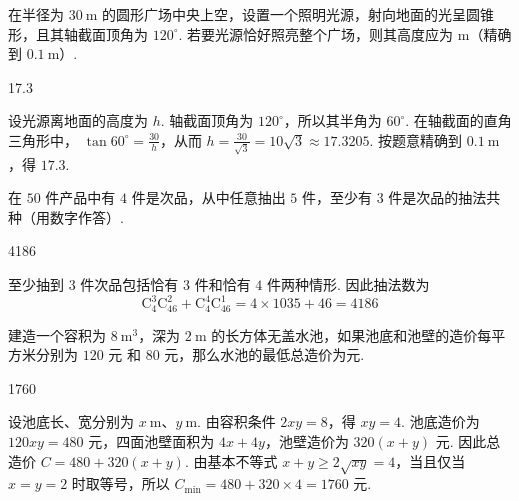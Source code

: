 \documentclass[UTF8,a4paper,oneside,11pt]{ctexbook}
\begin{document}
\begin{problem}
在半径为 \(30 \mathrm{~m}\) 的圆形广场中央上空，设置一个照明光源，射向地面的光呈圆锥形，且其轴截面顶角为 \(120^{\circ}\). 若要光源恰好照亮整个广场，则其高度应为\fillinblank{} \(\mathrm{m}\)（精确到 \(0.1 \mathrm{~m}\)）.
\end{problem}

\begin{answer}
17.3
\end{answer}

\begin{solution}
设光源离地面的高度为 \(h\). 轴截面顶角为 \(120^\circ\)，所以其半角为
\(60^\circ\). 在轴截面的直角三角形中，
\(\tan60^\circ=\frac{30}{h}\)，从而
\(h=\frac{30}{\sqrt3}=10\sqrt3\approx17.3205\). 按题意精确到
\(0.1\mathrm{~m}\)，得 \(17.3\).
\end{solution}

\begin{problem}
在 \(50\) 件产品中有 \(4\) 件是次品，从中任意抽出 \(5\) 件，至少有 \(3\) 件是次品的抽法共\fillinblank{}\(\text{种}\)（用数字作答）.
\end{problem}

\begin{answer}
4186
\end{answer}

\begin{solution}
至少抽到 \(3\) 件次品包括恰有 \(3\) 件和恰有 \(4\) 件两种情形. 因此抽法数为
\[
\mathrm C_4^3\mathrm C_{46}^2+\mathrm C_4^4\mathrm C_{46}^1
=4\times1035+46=4186
\]
\end{solution}

\begin{problem}
建造一个容积为 \(8 \mathrm{~m}^{3}\)，深为 \(2 \mathrm{~m}\) 的长方体无盖水池，如果池底和池壁的造价每平方米分别为 \(120\text{ 元}\) 和 \(80\text{ 元}\)，那么水池的最低总造价为\fillinblank{}\(\text{元}\).
\end{problem}

\begin{answer}
1760
\end{answer}

\begin{solution}
设池底长、宽分别为 \(x\mathrm{~m}\)、\(y\mathrm{~m}\). 由容积条件
\(2xy=8\)，得 \(xy=4\). 池底造价为 \(120xy=480\) 元，四面池壁面积为
\(4x+4y\)，池壁造价为 \(320(x+y)\) 元. 因此总造价
\(C=480+320(x+y)\). 由基本不等式
\(x+y\geqslant2\sqrt{xy}=4\)，当且仅当 \(x=y=2\) 时取等号，所以
\(C_{\min}=480+320\times4=1760\) 元.
\end{solution}
\end{document}

